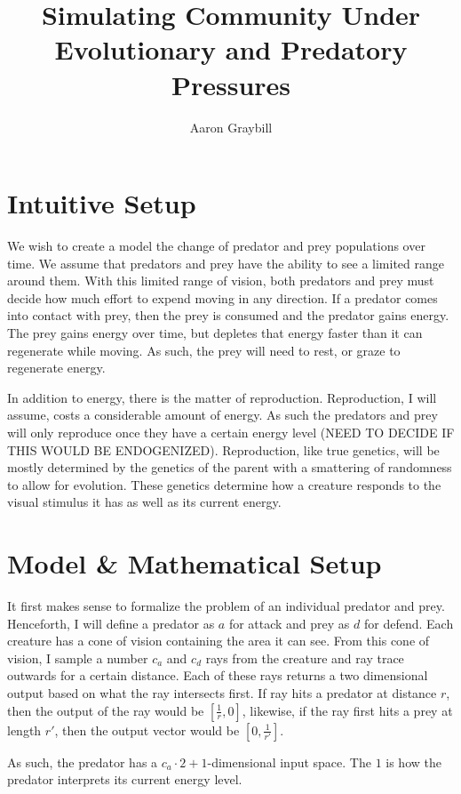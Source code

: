 \documentclass[12pt,english]{article}
\title{Simulating Community Under Evolutionary and Predatory Pressures}
\author{Aaron Graybill}
\begin{document}
\maketitle
\bigskip
\section{Intuitive Setup}

We wish to create a model the change of predator and prey populations over time. We assume that predators and prey have the ability to see a limited range around them. With this limited range of vision, both predators and prey must decide how much effort to expend moving in any direction. If a predator comes into contact with prey, then the prey is consumed and the predator gains energy. The prey gains energy over time, but depletes that energy faster than it can regenerate while moving. As such, the prey will need to rest, or graze to regenerate energy. 

In addition to energy, there is the matter of reproduction. Reproduction, I will assume, costs a considerable amount of energy. As such the predators and prey will only reproduce once they have a certain energy level (NEED TO DECIDE IF THIS WOULD BE ENDOGENIZED). Reproduction, like true genetics, will be mostly determined by the genetics of the parent with a smattering of randomness to allow for evolution. These genetics determine how a creature responds to the visual stimulus it has as well as its current energy.

\section{Model \& Mathematical Setup}

It first makes sense to formalize the problem of an individual predator and prey. Henceforth, I will define a predator as $a$ for attack and prey as $d$ for defend. Each creature has a cone of vision containing the area it can see. From this cone of vision, I sample a number $c_a$ and $c_d$ rays from the creature and ray trace outwards for a  certain distance. Each of these rays returns a two dimensional output based on what the ray intersects first. If ray hits a predator at distance $r$, then the output of the ray would be $[\frac{1}{r},0]$, likewise, if the ray first hits a prey at length $r'$, then the output vector would be $[0,\frac{1}{r'}]$. 

As such, the predator has a $c_a\cdot2+1$-dimensional input space. The $1$ is how the predator interprets its current energy level.
\end{document}
